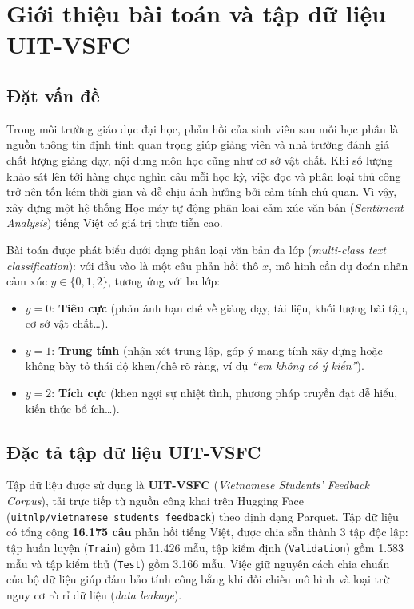 \documentclass[12pt,a4paper]{article}
\begin{document}
\section{Giới thiệu bài toán và tập dữ liệu UIT-VSFC}

\subsection{Đặt vấn đề}
Trong môi trường giáo dục đại học, phản hồi của sinh viên sau mỗi học phần là nguồn thông tin định tính quan trọng giúp giảng viên và nhà trường đánh giá chất lượng giảng dạy, nội dung môn học cũng như cơ sở vật chất. Khi số lượng khảo sát lên tới hàng chục nghìn câu mỗi học kỳ, việc đọc và phân loại thủ công trở nên tốn kém thời gian và dễ chịu ảnh hưởng bởi cảm tính chủ quan. Vì vậy, xây dựng một hệ thống Học máy tự động phân loại cảm xúc văn bản (\textit{Sentiment Analysis}) tiếng Việt có giá trị thực tiễn cao.

Bài toán được phát biểu dưới dạng phân loại văn bản đa lớp (\textit{multi-class text classification}): với đầu vào là một câu phản hồi thô $x$, mô hình cần dự đoán nhãn cảm xúc $y \in \{0, 1, 2\}$, tương ứng với ba lớp:
\begin{itemize}
    \item $y = 0$: \textbf{Tiêu cực} (phản ánh hạn chế về giảng dạy, tài liệu, khối lượng bài tập, cơ sở vật chất\dots).
    \item $y = 1$: \textbf{Trung tính} (nhận xét trung lập, góp ý mang tính xây dựng hoặc không bày tỏ thái độ khen/chê rõ ràng, ví dụ \textit{``em không có ý kiến''}).
    \item $y = 2$: \textbf{Tích cực} (khen ngợi sự nhiệt tình, phương pháp truyền đạt dễ hiểu, kiến thức bổ ích\dots).
\end{itemize}

\subsection{Đặc tả tập dữ liệu UIT-VSFC}
Tập dữ liệu được sử dụng là \textbf{UIT-VSFC} (\textit{Vietnamese Students' Feedback Corpus}), tải trực tiếp từ nguồn công khai trên Hugging Face (\texttt{uitnlp/vietnamese\_students\_feedback}) theo định dạng Parquet. Tập dữ liệu có tổng cộng \textbf{16.175 câu} phản hồi tiếng Việt, được chia sẵn thành 3 tập độc lập: tập huấn luyện (\texttt{Train}) gồm 11.426 mẫu, tập kiểm định (\texttt{Validation}) gồm 1.583 mẫu và tập kiểm thử (\texttt{Test}) gồm 3.166 mẫu. Việc giữ nguyên cách chia chuẩn của bộ dữ liệu giúp đảm bảo tính công bằng khi đối chiếu mô hình và loại trừ nguy cơ rò rỉ dữ liệu (\textit{data leakage}).
\end{document}
